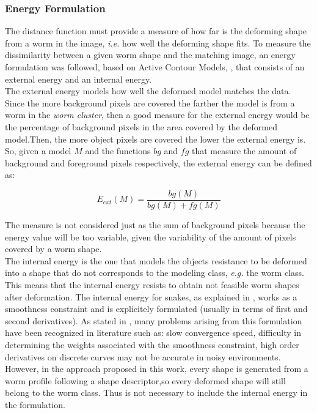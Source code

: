 \subsubsection*{Energy Formulation}
 
The distance function must provide a measure of how far is the deforming shape from a worm in the image, 
\emph{i.e.} how well
the deforming shape fits. To measure the dissimilarity between a given worm shape and the
matching image, an energy formulation was followed, based on Active Contour Models,
\cite{snakes}, that consists of an external energy and an internal energy.\\

The external energy models how well the deformed model matches the data. Since the more
background pixels are covered the farther the model is from a worm in the \emph{worm cluster}, 
then a good measure for the external energy would be the percentage of background pixels in the 
area covered by the deformed model.Then, the more object pixels are covered the lower the 
external energy is. So, given a model $M$ and the functions $bg$ and $fg$  that measure
the amount of background and foreground pixels respectively, the external energy
can be defined as:

$$E_{ext}(M) = \frac{bg(M)}{bg(M)+fg(M)}$$

The measure is not considered just as the sum of background pixels
because the energy value will be too variable, given the variability of the amount
of pixels covered by a worm shape.\\

The internal energy is the one that models the objects resistance to be deformed into
a shape that do not corresponds to the modeling class, \emph{e.g.} the worm class. 
This means that the internal energy resists to obtain not feasible worm
shapes after deformation. The internal energy for
snakes, as explained in \cite{snakes}, works as a smoothness constraint and is explicitely
formulated (usually in terms of first and second derivatives). As stated in \cite{bspline}, 
many problems arising from this formulation have been recognized in literature such as:
slow convergence speed, difficulty in determining the weights associated with the 
smoothness constraint, high order derivatives on discrete curves may not be accurate
in noisy environments.\\
However, in the approach proposed in this work, every shape is generated from a worm 
profile following a shape descriptor,so every deformed shape will still belong to the 
worm class. Thus is not necessary to include the internal energy in the 
formulation.

